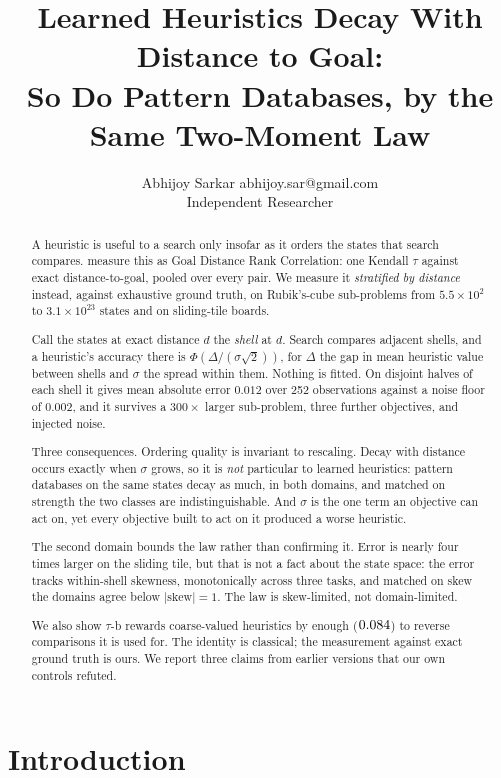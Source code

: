 \documentclass{article}
\title{Learned Heuristics Decay With Distance to Goal:\\
So Do Pattern Databases, by the Same Two-Moment Law}
\author{\name Abhijoy Sarkar \email abhijoy.sar@gmail.com \\
        \addr Independent Researcher}
\begin{document}
\maketitle

\begin{abstract}
A heuristic is useful to a search only insofar as it orders the states that
search compares. \citet{wilt2016} measure this as Goal Distance Rank Correlation:
one Kendall $\tau$ against exact distance-to-goal, pooled over every pair. We
measure it \emph{stratified by distance} instead, against exhaustive ground
truth, on Rubik's-cube sub-problems from $5.5\times10^{2}$ to
$3.1\times10^{23}$ states and on sliding-tile boards.

Call the states at exact distance $d$ the \emph{shell} at $d$.
Search compares adjacent shells, and a heuristic's accuracy there is
$\Phi(\Delta/(\sigma\sqrt{2}))$, for $\Delta$ the gap in mean heuristic
value between shells and $\sigma$ the spread within them. Nothing is fitted.
On disjoint halves of each shell it gives mean absolute error $0.012$ over 252
observations against a noise floor of $0.002$, and it survives a
$300\times$ larger sub-problem, three further objectives, and injected noise.

Three consequences. Ordering quality is invariant to rescaling. Decay with
distance occurs exactly when $\sigma$ grows, so it is \emph{not} particular to
learned heuristics: pattern databases on the same states decay as much, in both
domains, and matched on strength the two classes are indistinguishable. And
$\sigma$ is the one term an objective can act on, yet every objective built to act on it
produced a worse heuristic.

The second domain bounds the law rather than confirming it. Error is nearly four times larger on
the sliding tile, but that is not a fact about the state space:
the error tracks within-shell skewness, monotonically across three tasks, and
matched on skew the domains agree below $|\mathrm{skew}|=1$. The law is
skew-limited, not domain-limited.

We also show $\tau$-b rewards coarse-valued heuristics by enough ($0.084$) to
reverse comparisons it is used for. The identity is classical; the
measurement against exact ground truth is ours. We report three claims from
earlier versions that our own controls refuted.
\end{abstract}

\section{Introduction}
\end{document}
